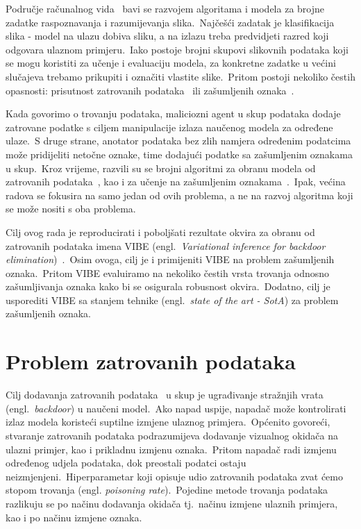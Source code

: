 \documentclass[diplomskirad]{fer}
\begin{document}
Područje računalnog vida~\cite{voulodimos2018deep} bavi se razvojem algoritama i modela za brojne zadatke raspoznavanja i razumijevanja slika.\ Najčešći zadatak je klasifikacija slika - model na ulazu dobiva sliku, a na izlazu treba predvidjeti razred koji odgovara ulaznom primjeru.\ 
Iako postoje brojni skupovi slikovnih podataka koji se mogu koristiti za učenje i evaluaciju modela, za konkretne zadatke u većini slučajeva trebamo prikupiti i označiti vlastite slike.\ 
Pritom postoji nekoliko čestih opasnosti: prisutnost zatrovanih podataka~\cite{biggio2012poisoning} ili zašumljenih oznaka~\cite{gupta2019dealing}.\ 

\pagebreak

Kada govorimo o trovanju podataka, maliciozni agent u skup podataka dodaje zatrovane podatke s ciljem manipulacije izlaza naučenog modela za određene ulaze.\ 
S druge strane, anotator podataka bez zlih namjera određenim podatcima može pridijeliti netočne oznake, time dodajući podatke sa zašumljenim oznakama u skup.\ 
Kroz vrijeme, razvili su se brojni algoritmi za obranu modela od zatrovanih podataka~\cite{li2021anti, huang2022backdoor, gao2023backdoor}, kao i za učenje na zašumljenim oznakama~\cite{liu2022robust, chen2024imprecise}.\ Ipak, većina radova se fokusira na samo jedan od ovih problema, a ne na razvoj algoritma koji se može nositi s oba problema.\ 
  
Cilj ovog rada je reproducirati i poboljšati rezultate okvira za obranu od zatrovanih podataka imena VIBE (engl.\ \textit{Variational inference for backdoor elimination})~\cite{sabolic2025seal}.\ 
Osim ovoga, cilj je i primijeniti VIBE na problem zašumljenih oznaka.\ Pritom VIBE evaluiramo na nekoliko čestih vrsta trovanja odnosno zašumljivanja oznaka kako bi se osigurala robusnost okvira.\ 
Dodatno, cilj je usporediti VIBE sa stanjem tehnike (engl.\ \textit{state of the art - SotA}) za problem zašumljenih oznaka.\
\chapter{Problem zatrovanih podataka}
\label{pog:zatrovani}

Cilj dodavanja zatrovanih podataka~\cite{biggio2012poisoning} u skup je ugrađivanje stražnjih vrata (engl.\ \textit{backdoor}) u naučeni model.\ Ako napad uspije, napadač može kontrolirati izlaz modela koristeći suptilne izmjene ulaznog primjera.\ 
Općenito govoreći, stvaranje zatrovanih podataka podrazumijeva dodavanje vizualnog okidača na ulazni primjer, kao i prikladnu izmjenu oznaka.\ Pritom napadač radi izmjenu određenog udjela podataka, dok preostali podatci ostaju neizmjenjeni.\ 
Hiperparametar koji opisuje udio zatrovanih podataka zvat ćemo stopom trovanja (engl. \textit{poisoning rate}).\ Pojedine metode trovanja podataka razlikuju se po načinu dodavanja okidača tj.\ načinu izmjene ulaznih primjera, kao i po načinu izmjene oznaka.\ 
  
\end{document}
